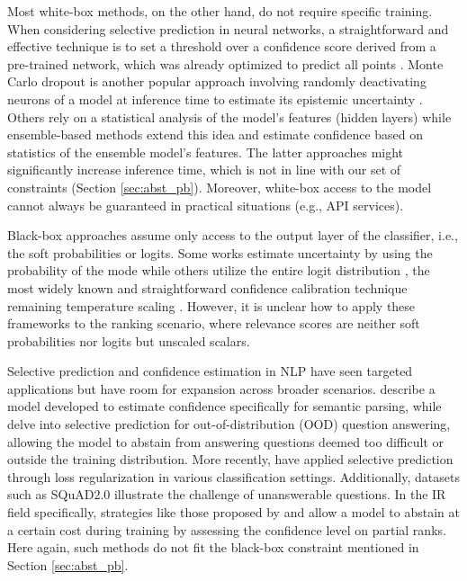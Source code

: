 Most white-box methods, on the other hand, do not require specific training. When considering selective prediction in neural networks, a straightforward and effective technique is to set a threshold over a confidence score derived from a pre-trained network, which was already optimized to predict all points . Monte Carlo dropout is another popular approach involving randomly deactivating neurons of a model at inference time to estimate its epistemic uncertainty . Others rely on a statistical analysis of the model's features (hidden layers)  while ensemble-based methods  extend this idea and estimate confidence based on statistics of the ensemble model’s features. The latter approaches might significantly increase inference time, which is not in line with our set of constraints (Section \ref{sec:abst_pb}). Moreover, white-box access to the model cannot always be guaranteed in practical situations (e.g., API services).

Black-box approaches assume only access to the output layer of the classifier, i.e., the soft probabilities or logits. Some works estimate uncertainty by using the probability of the mode  while others utilize the entire logit distribution , the most widely known and straightforward confidence calibration technique remaining temperature scaling . However, it is unclear how to apply these frameworks to the ranking scenario, where relevance scores are neither soft probabilities nor logits but unscaled scalars.

Selective prediction and confidence estimation in NLP have seen targeted applications but have room for expansion across broader scenarios.  describe a model developed to estimate confidence specifically for semantic parsing, while  delve into selective prediction for out-of-distribution (OOD) question answering, allowing the model to abstain from answering questions deemed too difficult or outside the training distribution. More recently,  have applied selective prediction through loss regularization in various classification settings. Additionally, datasets such as SQuAD2.0  illustrate the challenge of unanswerable questions. In the IR field specifically, strategies like those proposed by  and  allow a model to abstain at a certain cost during training by assessing the confidence level on partial ranks. Here again, such methods do not fit the black-box constraint mentioned in Section \ref{sec:abst_pb}.

